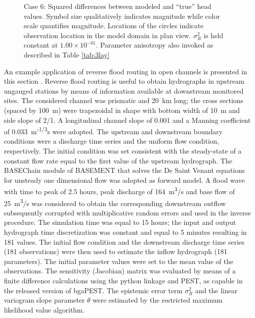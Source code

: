 \documentclass[11pt,oneside,onecolumn]{usgsreport}
\begin{document}
\begin{appendix}
\begin{figure}[!t]
\caption{\label{fig:3Lresid_case6}Case 6: Squared differences between modeled
and ``true'' head values. Symbol size qualitatively indicates magnitude
while color scale quantifies magnitude. Locations of the circles indicate
observation location in the model domain in plan view. $\sigma_{R}^{2}$ is held constant at $1.00\times10^{-01}$. Parameter anisotropy also invoked as described in Table \ref{tab:3lay}}
\end{figure}

\begin{bibunit}

An example application of reverse flood routing in open channels is
presented in this section \citep{doriareverserouting}. Reverse flood
routing is useful to obtain hydrographs in upstream ungauged stations
by means of information available at downstream monitored sites. The
considered channel was prismatic and 20~km long; the cross sections
(spaced by 100~m) were trapezoidal in shape with bottom width of
10~m and side slope of 2/1. A longitudinal channel slope of 0.001
and a Manning coefficient of 0.033~m\textsuperscript{-1/3}s were
adopted. The upstream and downstream boundary conditions were a discharge
time series and the uniform flow condition, respectively. The initial
condition was set consistent with the steady-state of a constant flow
rate equal to the first value of the upstream hydrograph. The BASEChain
module of BASEMENT \citep{Basement} that solves the De Saint Venant
equations for unsteady one dimensional flow was adopted as forward
model. A flood wave with time to peak of 2.5 hours, peak discharge
of 164~m\textsuperscript{3}/s and base flow of 25~m\textsuperscript{3}/s
was considered to obtain the corresponding downstream outflow subsequently
corrupted with multiplicative random errors and used in the inverse
procedure. The simulation time was equal to 15 hours; the input and
output hydrograph time discretization was constant and equal to 5
minutes resulting in 181 values. The initial flow condition and the
downstream discharge time series (181 observations) were then used
to estimate the inflow hydrograph (181 parameters). The initial parameter
values were set to the mean value of the observations. The sensitivity
(Jacobian) matrix was evaluated by means of a finite difference calculations
using the python linkage and PEST, as capable in the released version
of bgaPEST. The epistemic error term $\sigma_{R}^{2}$ and the linear
variogram slope parameter $\theta$ were estimated by the restricted
maximum likelihood value algorithm. 


\end{bibunit}
\end{appendix}
\end{document}

